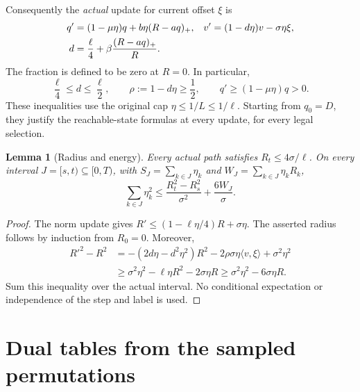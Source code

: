 \documentclass[11pt]{article}
\newtheorem{lemma}[theorem]{Lemma}
\theoremstyle{remark}
\newcommand{\ip}[2]{\langle #1,#2\rangle}
\begin{document}
Consequently the \emph{actual} update for current offset $\xi$ is
\begin{align}
 q'&=(1-\mu\eta)q+b\eta(R-aq)_+,
 &v'&=(1-d\eta)v-\sigma\eta\xi,\label{eq:dynamics}\\
 d&=\frac\ell4+\beta\frac{(R-aq)_+}{R}.\notag
\end{align}
The fraction is defined to be zero at $R=0$. In particular,
\begin{equation}\label{eq:retention-basic}
 \frac\ell4\le d\le\frac\ell2,\qquad
 \rho:=1-d\eta\ge\frac12,\qquad
 q'\ge(1-\mu\eta)q>0.
\end{equation}
These inequalities use the original cap $\eta\le1/L\le1/\ell$.
Starting from $q_0=D$, they justify the reachable-state formulas at
every update, for every legal selection.

\begin{lemma}[Radius and energy]\label{lem:energy}
Every actual path satisfies $R_t\le4\sigma/\ell$. On every interval
$J=[s,t)\subseteq[0,T)$, with
$S_J=\sum_{k\in J}\eta_k$ and $W_J=\sum_{k\in J}\eta_kR_k$,
\begin{equation}\label{eq:energy}
 \sum_{k\in J}\eta_k^2
 \le\frac{R_t^2-R_s^2}{\sigma^2}+\frac{6W_J}{\sigma}.
\end{equation}
\end{lemma}
\begin{proof}
The norm update gives
$R'\le(1-\ell\eta/4)R+\sigma\eta$. The asserted radius follows
by induction from $R_0=0$. Moreover,
\begin{align*}
 R'^2-R^2
 &=-(2d\eta-d^2\eta^2)R^2
       -2\rho\sigma\eta\ip v\xi+\sigma^2\eta^2\\
 &\ge\sigma^2\eta^2-\ell\eta R^2-2\sigma\eta R
 \ge\sigma^2\eta^2-6\sigma\eta R.
\end{align*}
Sum this inequality over the actual interval. No conditional
expectation or independence of the step and label is used.
\end{proof}

\section{Dual tables from the sampled permutations}
\end{document}
